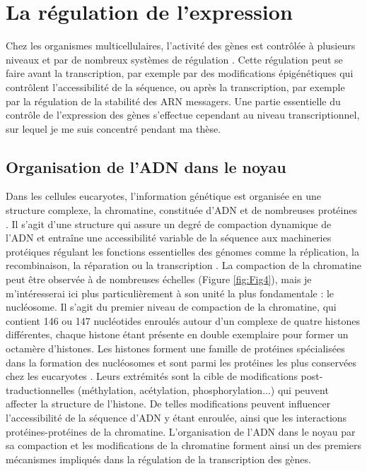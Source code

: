 \chapter{La régulation de l’expression}
{\hypersetup{linkcolor=GREYDARK}\minitoc}
\label{chap:regulation-de-expression}

Chez les organismes multicellulaires, l’activité des gènes est contrôlée à plusieurs niveaux et par de nombreux systèmes de régulation \citep{maston_transcriptional_2006}. Cette régulation peut se faire avant la transcription, par exemple par des modifications épigénétiques qui contrôlent l’accessibilité de la séquence, ou après la transcription, par exemple par la régulation de la stabilité des \acrshort{ARN} messagers. Une partie essentielle du contrôle de l’expression des gènes s’effectue cependant au niveau transcriptionnel, sur lequel je me suis concentré pendant ma thèse.

\section{Organisation de l’ADN dans le noyau}
\label{sec:organisation-ADN}

Dans les cellules eucaryotes, l’information génétique est organisée en une structure complexe, la chromatine, constituée d'\acrshort{ADN} et de nombreuses protéines \citep{kornberg_chromatin_1992}. Il s’agit d’une structure qui assure un degré de compaction dynamique de l’ADN et entraîne une accessibilité variable de la séquence aux machineries protéiques régulant les fonctions essentielles des génomes comme la réplication, la recombinaison, la réparation ou la transcription \citep{felsenfeld_controlling_2003}. La compaction de la chromatine peut être observée à de nombreuses échelles (Figure \ref{fig:Fig4}), mais je m’intéresserai ici plus particulièrement à son unité la plus fondamentale : le nucléosome. Il s’agit du premier niveau de compaction de la chromatine, qui contient 146 ou 147 nucléotides enroulés autour d’un complexe de quatre histones différentes, chaque histone étant présente en double exemplaire pour former un octamère d’histones. Les histones forment une famille de protéines spécialisées dans la formation des nucléosomes et sont parmi les protéines les plus conservées chez les eucaryotes \citep{sandman_diversity_1998}. Leurs extrémités sont la cible de modifications post-traductionnelles (méthylation, acétylation, phosphorylation...) qui peuvent affecter la structure de l’histone. De telles modifications peuvent influencer l’accessibilité de la séquence d’ADN y étant enroulée, ainsi que les interactions protéines-protéines de la chromatine. L’organisation de l’ADN dans le noyau par sa compaction et les modifications de la chromatine forment ainsi un des premiers mécanismes impliqués dans la régulation de la transcription des gènes.

